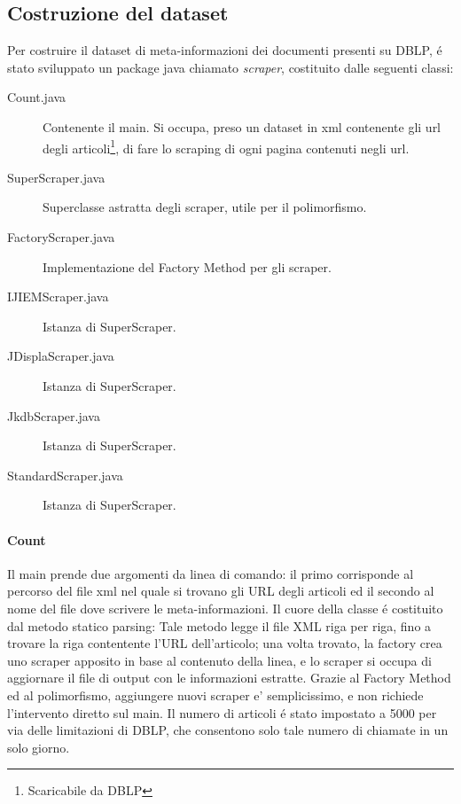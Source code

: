 \documentclass[11pt,twoside,a4paper]{article}
\begin{document}
\subsection{Costruzione del dataset}
Per costruire il dataset di meta-informazioni dei documenti presenti su DBLP, \'e stato sviluppato un package java chiamato \emph{scraper}, costituito dalle seguenti classi:
\begin{description}
	\item[Count.java] Contenente il main. Si occupa, preso un dataset in xml contenente gli url degli articoli\footnote{Scaricabile da DBLP}, di fare lo scraping di ogni pagina contenuti negli url.
	\item[SuperScraper.java] Superclasse astratta degli scraper, utile per il polimorfismo.
	\item[FactoryScraper.java] Implementazione del Factory Method per gli scraper.
	\item[IJIEMScraper.java] Istanza di SuperScraper.
	\item[JDisplaScraper.java] Istanza di SuperScraper.
	\item[JkdbScraper.java] Istanza di SuperScraper.
	\item[StandardScraper.java] Istanza di SuperScraper.
\end{description}

\paragraph{Count}
\label{par:count_}



Il main prende due argomenti da linea di comando: il primo corrisponde al percorso del file xml nel quale si trovano gli URL degli articoli ed il secondo al nome del file dove scrivere le meta-informazioni. Il cuore della classe \'e costituito dal metodo statico parsing: Tale metodo legge il file XML riga per riga, fino a trovare la riga contentente l'URL dell'articolo; una volta trovato, la factory crea uno scraper apposito in base al contenuto della linea, e lo scraper si occupa di aggiornare il file di output con le informazioni estratte. Grazie al Factory Method ed al polimorfismo, aggiungere nuovi scraper e' semplicissimo, e non richiede l'intervento diretto sul main. Il numero di articoli \'e stato impostato a 5000 per via delle limitazioni di DBLP, che consentono solo tale numero di chiamate in un solo giorno.
\end{document}
